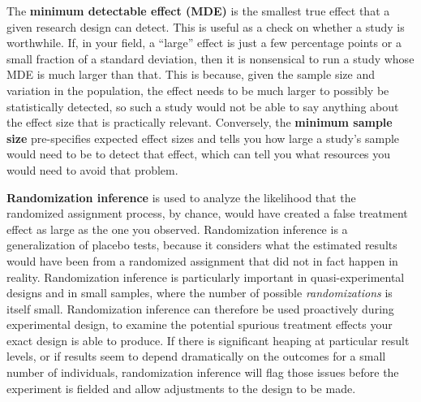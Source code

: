 The \textbf{minimum detectable effect (MDE)}
is the smallest true effect that a given research design can detect.
This is useful as a check on whether a study is worthwhile.
If, in your field, a ``large'' effect is just a few percentage points
or a small fraction of a standard deviation,
then it is nonsensical to run a study whose MDE is much larger than that.
This is because, given the sample size and variation in the population,
the effect needs to be much larger to possibly be statistically detected,
so such a study would not be able to say anything about the effect size that is practically relevant.
Conversely, the \textbf{minimum sample size} pre-specifies expected effect sizes
and tells you how large a study's sample would need to be to detect that effect,
which can tell you what resources you would need to avoid that problem.

\textbf{Randomization inference} is used to analyze the likelihood
that the randomized assignment process, by chance,
would have created a false treatment effect as large as the one you observed.
Randomization inference is a generalization of placebo tests,
because it considers what the estimated results would have been
from a randomized assignment that did not in fact happen in reality.
Randomization inference is particularly important
in quasi-experimental designs and in small samples,
where the number of possible \textit{randomizations} is itself small.
Randomization inference can therefore be used proactively during experimental design,
to examine the potential spurious treatment effects your exact design is able to produce.
If there is significant heaping at particular result levels,
or if results seem to depend dramatically on the outcomes for a small number of individuals,
randomization inference will flag those issues before the experiment is fielded
and allow adjustments to the design to be made.
